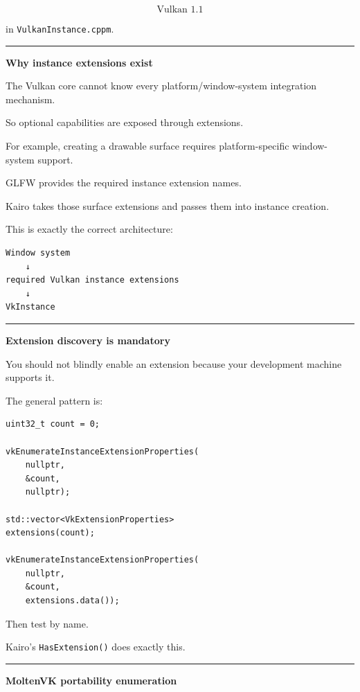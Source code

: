 \[
\boxed{\text{Vulkan 1.1}}
\]

in \texttt{VulkanInstance.cppm}.

\begin{center}\rule{0.5\linewidth}{0.5pt}\end{center}

\textbf{Why instance extensions exist}

The Vulkan core cannot know every platform/window-system integration mechanism.

So optional capabilities are exposed through extensions.

For example, creating a drawable surface requires platform-specific window-system support.

GLFW provides the required instance extension names.

Kairo takes those surface extensions and passes them into instance creation.

This is exactly the correct architecture:

\begin{verbatim}
Window system
    ↓
required Vulkan instance extensions
    ↓
VkInstance
\end{verbatim}

\begin{center}\rule{0.5\linewidth}{0.5pt}\end{center}

\textbf{Extension discovery is mandatory}

You should not blindly enable an extension because your development machine supports it.

The general pattern is:

\begin{verbatim}
uint32_t count = 0;

vkEnumerateInstanceExtensionProperties(
    nullptr,
    &count,
    nullptr);

std::vector<VkExtensionProperties>
extensions(count);

vkEnumerateInstanceExtensionProperties(
    nullptr,
    &count,
    extensions.data());
\end{verbatim}

Then test by name.

Kairo's \texttt{HasExtension()} does exactly this.

\begin{center}\rule{0.5\linewidth}{0.5pt}\end{center}

\textbf{MoltenVK portability enumeration}

